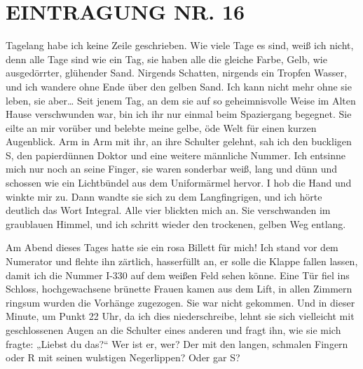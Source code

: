 \section{EINTRAGUNG NR. 16}

Tagelang habe ich keine Zeile geschrieben. Wie viele Tage es sind,
weiß ich nicht, denn alle Tage sind wie ein Tag, sie haben alle die
gleiche Farbe, Gelb, wie ausgedörrter, glühender Sand. Nirgends
Schatten, nirgends ein Tropfen Wasser, und ich wandere ohne Ende
über den gelben Sand. Ich kann nicht mehr ohne sie leben, sie
aber\ldots{} Seit jenem Tag, an dem sie auf so geheimnisvolle Weise im
Alten Hause verschwunden war, bin ich ihr nur einmal beim
Spaziergang begegnet. Sie eilte an mir vorüber und belebte meine
gelbe, öde Welt für einen kurzen Augenblick. Arm in Arm mit ihr, an
ihre Schulter gelehnt, sah ich den buckligen S, den papierdünnen
Doktor und eine weitere männliche Nummer. Ich entsinne mich nur
noch an seine Finger, sie waren sonderbar weiß, lang und dünn und
schossen wie ein Lichtbündel aus dem Uniformärmel hervor. I hob
die Hand und winkte mir zu. Dann wandte sie sich zu dem
Langfingrigen, und ich hörte deutlich das Wort Integral. Alle vier
blickten mich an. Sie verschwanden im graublauen Himmel, und ich
schritt wieder den trockenen, gelben Weg entlang.

Am Abend dieses Tages hatte sie ein rosa Billett für mich! Ich
stand vor dem Numerator und flehte ihn zärtlich, hasserfüllt an, er
solle die Klappe fallen lassen, damit ich die Nummer I-330 auf dem
weißen Feld sehen könne. Eine Tür fiel ins Schloss, hochgewachsene
brünette Frauen kamen aus dem Lift, in allen Zimmern ringsum wurden
die Vorhänge zugezogen. Sie war nicht gekommen. Und in dieser
Minute, um Punkt 22 Uhr, da ich dies
niederschreibe, lehnt sie sich vielleicht mit geschlossenen Augen
an die Schulter eines anderen und fragt ihn, wie sie mich fragte:
„Liebst du das?“ Wer ist er, wer? Der mit den langen, schmalen
Fingern oder R mit seinen wulstigen Negerlippen? Oder gar S?

